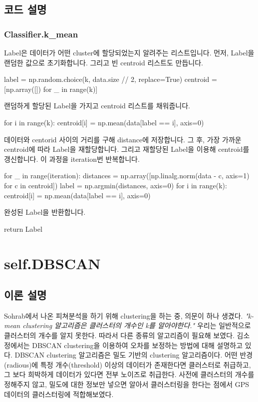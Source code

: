 \documentclass{oblivoir}
\begin{document}
  \subsection{코드 설명}
  \subsubsection{Classifier.k\_mean}
  Label은 데이터가 어떤 cluster에 할당되었는지 알려주는 리스트입니다.
  먼저, Label을 랜덤한 값으로 초기화합니다. 그리고 빈 centroid 리스트도 만듭니다.
  \begin{python}[label={GPS_clustering_1}]
    label = np.random.choice(k, data.size // 2, replace=True)
    centroid = [np.array([]) for _ in range(k)]
  \end{python}
  랜덤하게 할당된 Label을 가지고 centroid 리스트를 채워줍니다.
  \begin{python}[label={GPS_clustering_2}]
    for i in range(k):
      centroid[i] = np.mean(data[label == i], axis=0)
  \end{python}
  데이터와 centorid 사이의 거리를 구해 distance에 저장합니다. 그 후, 가장 가까운 centroid에 따라 Label을 재할당합니다.
  그리고 재할당된 Label을 이용해 centroid를 갱신합니다. 이 과정을 iteration번 반복합니다.
  \begin{python}[label={GPS_clustering_3}]
    for _ in range(iteration):
      distances = np.array([np.linalg.norm(data - c, axis=1) for c in centroid])
      label = np.argmin(distances, axis=0)
      for i in range(k):
        centroid[i] = np.mean(data[label == i], axis=0)
  \end{python}
  완성된 Label을 반환합니다.
  \begin{python}[label={GPS_clustering_4}]
    return Label
  \end{python}

  \section{self.DBSCAN}
  \subsection{이론 설명}
  Sohrab\cite{Sohrab}에서 나온 피쳐분석을 하기 위해 clustering을 하는 중, 의문이 하나 생겼다.
  \emph{"k-mean clustering 알고리즘은 클러스터의 개수인 k를 알아야한다."}
  우리는 일반적으로 클러스터의 개수를 알지 못한다. 따라서 다른 종류의 알고리즘이 필요해 보였다.
  김소정\cite{김소정}에서는 DBSCAN clustering을 이용하여 오차를 보정하는 방법에 대해 설명하고 있다.
  DBSCAN clustering 알고리즘은 밀도 기반의 clustering 알고리즘이다.
  어떤 반경(radious)에 특정 개수(threshold) 이상의 데이터가 존재한다면 클러스터로 취급하고, 그 보다 희박하게 데이터가 있다면 전부 노이즈로 취급한다.
  사전에 클러스터의 개수를 정해주지 않고, 밀도에 대한 정보만 넣으면 알아서 클러스터링을 한다는 점에서 GPS 데이터의 클러스터링에 적합해보였다.
\end{document}
